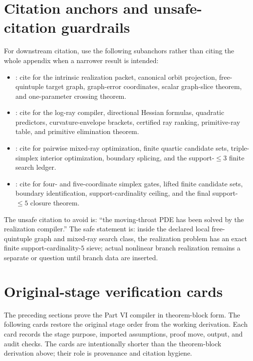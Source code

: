 \section{Citation anchors and unsafe-citation guardrails}
\label{sec:app-part06-citation-anchors-guardrails}

For downstream citation, use the following subanchors rather than citing the whole appendix when a narrower result is intended:
\begin{itemize}[leftmargin=2.2em]
  \item {}: cite for the intrinsic realization packet, canonical orbit projection, free-quintuple target graph, graph-error coordinates, scalar graph-slice theorem, and one-parameter crossing theorem.
  \item {}: cite for the log-ray compiler, directional Hessian formulas, quadratic predictors, curvature-envelope brackets, certified ray ranking, primitive-ray table, and primitive elimination theorem.
  \item {}: cite for pairwise mixed-ray optimization, finite quartic candidate sets, triple-simplex interior optimization, boundary splicing, and the support-\(\le3\) finite search ledger.
  \item {}: cite for four- and five-coordinate simplex gates, lifted finite candidate sets, boundary identification, support-cardinality ceiling, and the final support-\(\le5\) closure theorem.
\end{itemize}

The unsafe citation to avoid is: ``the moving-throat PDE has been solved by the realization compiler.''  The safe statement is: inside the declared local free-quintuple graph and mixed-ray search class, the realization problem has an exact finite support-cardinality-\(5\) sieve; actual nonlinear branch realization remains a separate \StatusOpen{} or \StatusNumerical{} question until branch data are inserted.



\section{Original-stage verification cards}
\label{sec:app-part06-original-stage-verification-cards}

The preceding sections prove the Part VI compiler in theorem-block form.  The following cards restore the original stage order from the working derivation.  Each card records the stage purpose, imported assumptions, proof move, output, and audit checks.  The cards are intentionally shorter than the theorem-block derivation above; their role is provenance and citation hygiene.


